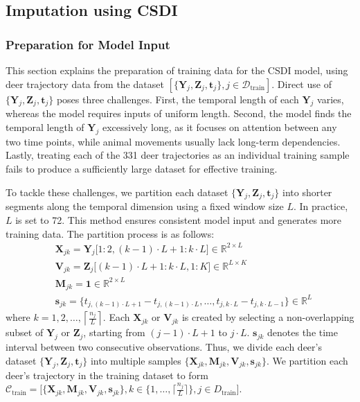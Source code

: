 \documentclass[11pt]{article}
\begin{document}
\subsection{Imputation using CSDI}
\subsubsection{Preparation for Model Input}\label{sec: model training}
This section explains the preparation of training data for the CSDI model, using deer trajectory data from the dataset $[\{\bm{Y}_j,\bm{Z}_j,\bm{t}_j\},j\in \mathcal{D}_{\mathrm{train}}]$. Direct use of $\{\bm{Y}_j,\bm{Z}_j,\bm{t}_j\}$ poses three challenges. First, the temporal length of each $\bm{Y}_j$ varies, whereas the model requires inputs of uniform length. Second, the model finds the temporal length of $\bm{Y}_j$ excessively long, as it focuses on attention between any two time points, while animal movements usually lack long-term dependencies. Lastly, treating each of the 331 deer trajectories as an individual training sample fails to produce a sufficiently large dataset for effective training.


To tackle these challenges, we partition each dataset $\{\bm{Y}_j,\bm{Z}_j,\bm{t}_j\}$ into shorter segments along the temporal dimension using a fixed window size $L$. In practice, $L$ is set to 72. This method ensures consistent model input and generates more training data. The partition process is as follows:
\begin{align}
	&\bm{X}_{jk} = \bm{Y}_j\big[1:2,(k-1)\cdot L+1: k\cdot L\big]\in \mathbb{R}^{2\times L}\\
	&\bm{V}_{jk} = \bm{Z}_j\big[(k-1)\cdot L+1: k\cdot L, 1:K\big]\in \mathbb{R}^{L\times K}\\
	&\bm{M}_{jk}=\mathbf{1}\in \mathbb{R}^{2 \times L}\\
	&\bm{s}_{jk}=\{t_{j,(k-1)\cdot L+1}-t_{j,(k-1)\cdot L},\ldots, t_{j,k\cdot L}-t_{j,k\cdot L-1}\}\in \mathbb{R}^L
\end{align}
where $k=1,2,\ldots,\left\lceil\frac{n_j}{L}\right\rceil$. Each $\bm{X}_{jk}$ or $\bm{V}_{jk}$ is created by selecting a non-overlapping subset of $\bm{Y}_j$ or $\bm{Z}_j$, starting from $(j-1)\cdot L+1$ to $j\cdot L$. $\bm{s}_{jk}$ denotes the time interval between two consecutive observations. Thus, we divide each deer's dataset $\{\bm{Y}_j,\bm{Z}_j,\bm{t}_j\}$ into multiple samples $\{\bm{X}_{jk},\bm{M}_{jk},\bm{V}_{jk}, \bm{s}_{jk}\}$. We partition each deer's trajectory in the training dataset to form $\mathcal{C}_{\mathrm{train}}=\big[\{\bm{X}_{jk},\bm{M}_{jk},\bm{V}_{jk}, \bm{s}_{jk}\}, k\in \{1,\ldots, \lceil \frac{n_j}{L}\rceil\},j\in D_{\mathrm{train}}\big]$.
\end{document}
